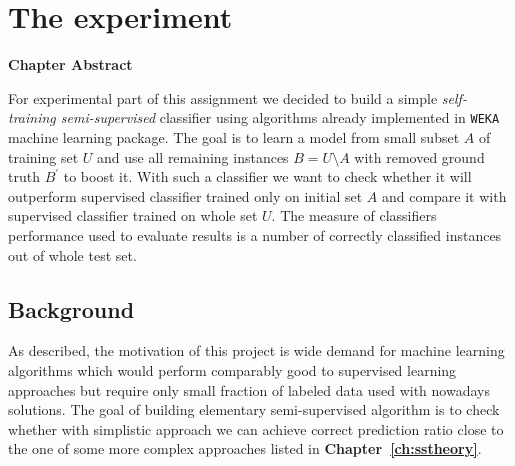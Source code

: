 \documentclass[12pt, a4paper, pdflatex]{report}
\newenvironment{chapabstract}
{
	\vspace{0.5cm}
	\small
	\begin{center}
    \bfseries Chapter Abstract
    \end{center}
}{\vspace{1.5cm}}
\begin{document}
\chapter{The experiment}

\begin{chapabstract}
For experimental part of this assignment we decided to build a simple \emph{self-training semi-supervised} classifier using algorithms already implemented in \texttt{WEKA} machine learning package. The goal is to learn a model from small subset $A$ of training set $U$ and use all remaining instances $B = U \setminus A$ with removed ground truth $B^{\prime}$ to boost it. With such a classifier we want to check whether it will outperform supervised classifier trained only on initial set $A$ and compare it with supervised classifier trained on whole set $U$. The measure of classifiers performance used to evaluate results is a number of correctly classified instances out of whole test set.
\end{chapabstract}

\section{Background}
As described, the motivation of this project is wide demand for machine learning algorithms which would perform comparably good to supervised learning approaches but require only small fraction of labeled data used with nowadays solutions. The goal of building elementary semi-supervised algorithm is to check whether with simplistic approach we can achieve correct prediction ratio close to the one of some more complex approaches listed in \textbf{Chapter~\ref{ch:sstheory}}. 
\end{document}
